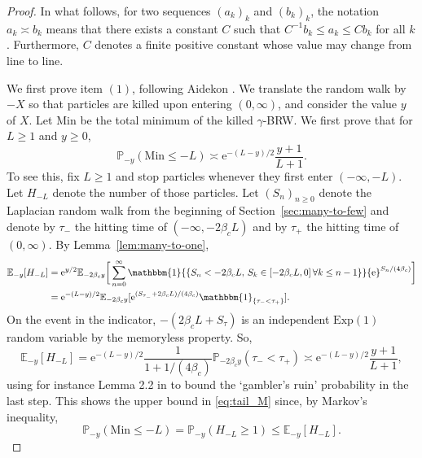 \documentclass[a4paper, a4wide, 10pt, reqno]{amsart}
\theoremstyle{plain}
\theoremstyle{definition}
\numberwithin{equation}{section}
\newcommand{\E}{\mathbb E}
\newcommand{\Prob}{\mathbb{P}}
\newcommand{\re}{{\mathrm e}}
\newcommand{\ind}[1]{\mathbbm{1}_{\{#1\}}}
\newcommand{\Ind}[1]{\mathbbm{1}{\{#1\}}}
\begin{document}
 \begin{proof}
 In what follows, for two sequences $(a_k)_k$ and $(b_k)_k$, the notation $a_k\asymp b_k$ means that there exists a constant $C$ such that $C^{-1}b_k \le a_k \le C b_k$ for all $k$. Furthermore, $C$ denotes a finite positive constant whose value may change from line to line.\smallskip
 
     We first prove item $(1)$, following Aidekon \cite{aidekon2010tail}.  
      We translate the random walk by $-X$ so that particles are killed upon entering $(0, \infty)$, and consider the value $y$ of $X$. Let $\mathrm{Min}$ be the total minimum of the killed $\gamma$-BRW. We first prove that  for  $L\ge 1$ and $y\ge0$,
     \begin{equation}
     \label{eq:tail_M}
     \Prob_{-y}(\mathrm{Min} \le -L) \asymp \re^{-(L-y)/2} \frac{y+1}{L+1}.
     \end{equation}
     To see this, fix $L\ge 1$ and stop particles whenever they first enter $(-\infty,-L)$. 
     Let $H_{-L}$ denote the number of those particles. Let $(S_n)_{n\ge0}$ denote the Laplacian random walk from the beginning of Section~\ref{sec:many-to-few} and denote by $\tau_-$ the hitting time of $(-\infty,-2\beta_cL)$ and by $\tau_+$ the hitting time of $(0,\infty)$. By Lemma~\ref{lem:many-to-one}, 
     \begin{align*}
     \E_{-y}[H_{-L}] 
     &= \re^{y/2} \E_{-2\beta_c y}\bigg[\sum_{n=0}^\infty \Ind{S_n < -2\beta_c L,\,S_k \in [-2\beta_c L,0]\,\forall k\le n-1} \re^{S_n/(4\beta_c)}\bigg] \\
     &= \re^{-(L-y)/2} \E_{-2\beta_c y}[\re^{(S_{\tau_{-}} +2\beta_c L)/(4\beta_c)}\ind{\tau_- < \tau_+}].
     \end{align*}
     On the event in the indicator, $-(2\beta_cL+S_{\tau})$ is an independent $\mathrm{Exp}(1)$ random variable by the memoryless property. So, 
     \begin{equation}\label{eq:H_first_moment}
      \E_{-y}[H_{-L}] = \re^{-(L-y)/2}\frac{1}{1+1/(4\beta_c)}\Prob_{-2\beta_c y}(\tau_-<\tau_+)\asymp \re^{-(L-y)/2} \frac{y+1}{L+1},
     \end{equation}
     using for instance Lemma 2.2 in \cite{aidekon2010tail} to bound the `gambler's ruin' probability in the last step.
      This shows the upper bound in \eqref{eq:tail_M} since, by Markov's inequality,
     \begin{equation}
     	\label{eq:M_upper_bound}
     \Prob_{-y}(\mathrm{Min}\le -L) = \Prob_{-y}(H_{-L} \ge 1) \le \E_{-y}[H_{-L}].
     \end{equation}

\end{proof}
\end{document}
